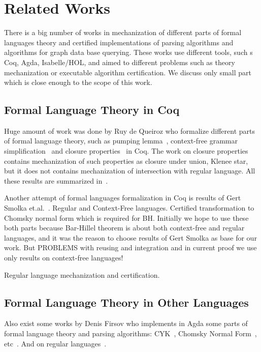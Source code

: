 \section{Related Works}

There is a big number of works in mechanization of different parts of formal languages theory and certified implementations of parsing algorithms and algorithms for graph data base querying.
These works use different tools, such s Coq, Agda, Isabelle/HOL, and aimed to different problems such as theory mechanization or executable algorithm certification.
We discuss only small part which is close enough to the scope of this work.

\subsection{Formal Language Theory in Coq}
Huge amount of work was done by Ruy de Queiroz who formalize different parts of formal language theory, such as pumping lemma~\cite{ramos2015formalizationPumping}, context-free grammar simplification~\cite{ramos2015formalization} and closure properties~\cite{ramos2015formalizationClosure} in Coq.
The work on closure properties contains mechanization of such properties as closure under union, Klenee star, but it does not contains mechanization of intersection with regular language.
All these results are summarized in~\cite{ramos2016formalization}. 

Another attempt of formal languages formalization in Coq is results of Gert Smolka et.al.~\cite{smolka2017regular,smolka2013regular,kaiser2012constructive}.
Regular and Context-Free languages. 
Certified transformation to Chomsky normal form which is required for BH. 
Initially we hope to use these both parts because Bar-Hillel theorem is about both context-free and regular languages, and it was the reason to choose results of Gert Smolka as base for our work.
But PROBLEMS with reusing and integration and in current proof we use only results on context-free languages!

Regular language mechanization and certification.

\subsection{Formal Language Theory in Other Languages}

Also exist some works by Denis Firsov who implements in Agda some parts of formal language theory and parsing algorithms: CYK~\cite{firsov2014certified}, Chomsky Normal Form~\cite{firsov2015certified}, etc~\cite{firsov2016cfl}.
And on regular languages~\cite{10.1007/978-3-319-03545-1_7}.

